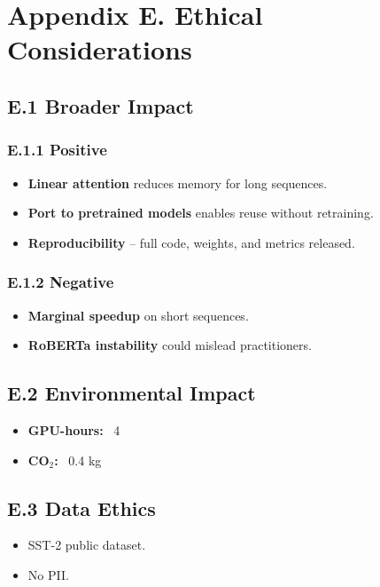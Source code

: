 \section{Appendix E. Ethical Considerations}

\subsection{E.1 Broader Impact}

\subsubsection{E.1.1 Positive}

\begin{itemize}
\item \textbf{Linear attention} reduces memory for long sequences.
\item \textbf{Port to pretrained models} enables reuse without retraining.
\item \textbf{Reproducibility} -- full code, weights, and metrics released.

\end{itemize}
\subsubsection{E.1.2 Negative}

\begin{itemize}
\item \textbf{Marginal speedup} on short sequences.
\item \textbf{RoBERTa instability} could mislead practitioners.

\end{itemize}
\subsection{E.2 Environmental Impact}

\begin{itemize}
\item \textbf{GPU-hours:} ~4
\item \textbf{CO$_2$:} ~0.4 kg

\end{itemize}
\subsection{E.3 Data Ethics}

\begin{itemize}
\item SST-2 public dataset.
\item No PII.

\end{itemize}
